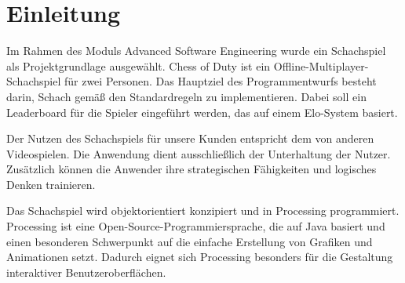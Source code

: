 \chapter{Einleitung}

Im Rahmen des Moduls \glqq Advanced Software Engineering\grqq{} wurde ein Schachspiel als Projektgrundlage ausgewählt. 
Chess of Duty ist ein Offline-Multiplayer-Schachspiel für zwei Personen. 
Das Hauptziel des Programmentwurfs besteht darin, Schach gemäß den Standardregeln zu implementieren. 
Dabei soll ein Leaderboard für die Spieler eingeführt werden, das auf einem Elo-System basiert.

Der Nutzen des Schachspiels für unsere Kunden entspricht dem von anderen Videospielen. 
Die Anwendung dient ausschließlich der Unterhaltung der Nutzer. 
Zusätzlich können die Anwender ihre strategischen Fähigkeiten und logisches Denken trainieren.

Das Schachspiel wird objektorientiert konzipiert und in Processing programmiert. 
Processing ist eine Open-Source-Programmiersprache, die auf Java basiert und einen besonderen Schwerpunkt auf die einfache Erstellung von Grafiken und Animationen setzt. 
Dadurch eignet sich Processing besonders für die Gestaltung interaktiver Benutzeroberflächen. 
